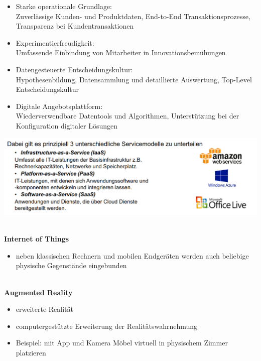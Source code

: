 \documentclass[a4]{scrartcl}
\begin{document}
\begin{itemize}
\item Starke operationale Grundlage: \\
Zuverlässige Kunden- und Produktdaten, End-to-End Transaktionsprozesse, Transparenz bei Kundentransaktionen

\item Experimentierfreudigkeit: \\
Umfassende Einbindung von Mitarbeiter in Innovationsbemühungen

\item Datengesteuerte Entscheidungskultur: \\
Hypothesenbildung, Datensammlung und detaillierte Auswertung, Top-Level Entscheidungskultur

\item Digitale Angebotsplattform: \\
Wiederverwendbare Datentools und Algorithmen, Unterstützung bei der Konfiguration digitaler Lösungen

\end{itemize}

\includegraphics[scale=0.4]{repeat.png}

\ \\

\textbf{Internet of Things}
\begin{itemize}
\item neben klassischen Rechnern und mobilen Endgeräten werden auch beliebige physische Gegenstände eingebunden
\end{itemize}

\ \\
\textbf{Augmented Reality}
\begin{itemize}
\item erweiterte Realität
\item computergestützte Erweiterung der Realitätswahrnehmung
\item Beispiel: mit App und Kamera Möbel virtuell in physischem Zimmer platzieren
\end{itemize}
\ \\
\end{document}
